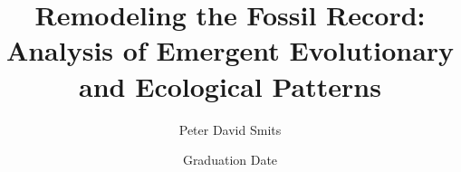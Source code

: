 \documentclass{ucetd}  %
\title{Remodeling the Fossil Record: Analysis of Emergent Evolutionary and Ecological Patterns}
\author{Peter David Smits}
\date{Graduation Date}
\begin{document}
\maketitle

\makecopyright
\makededication
\makeepigraph


\tableofcontents
\listoffigures
\listoftables

\acknowledgments

\abstract

\mainmatter











\makebibliography

%
%
\end{document}
